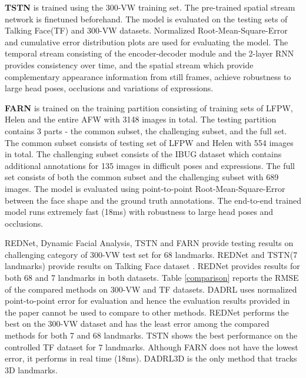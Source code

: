 \documentclass{llncs}
\begin{document}
\textbf{TSTN} \cite{tstn} is trained using the 300-VW training set. The pre-trained spatial stream network is finetuned beforehand. The model is evaluated on the testing sets of Talking Face(TF) and 300-VW datasets. Normalized Root-Mean-Square-Error and cumulative error distribution plots are used for evaluating the model. The temporal stream consisting of the encoder-decoder module and the 2-layer RNN provides consistency over time, and the spatial stream which provide complementary appearance information from still frames, achieve robustness to large head poses, occlusions and variations of expressions. 

\textbf{FARN} \cite{farn} is trained on the training partition consisting of training sets of LFPW, Helen and the entire AFW with 3148 images in total. The testing partition contains 3 parts - the common subset, the challenging subset, and the full set. The common subset consists of testing set of LFPW and Helen with 554 images in total. The challenging subset consists of the IBUG dataset which contains additional annotations for 135 images in difficult poses and expressions. The full set consists of both the common subset and the challenging subset with 689 images. The model is evaluated using point-to-point Root-Mean-Square-Error between the face shape and the ground truth annotations. The end-to-end trained model runs extremely fast (18ms) with robustness to large head poses and occlusions.

REDNet\cite{rednet}, Dynamic Facial Analysis\cite{dynamic_facial_analysis}, TSTN\cite{tstn} and FARN\cite{farn} provide testing results on challenging category of 300-VW test set for 68 landmarks. REDNet\cite{rednet} and TSTN\cite{tstn}(7 landmarks) provide results on Talking Face dataset \cite{tf}. REDNet\cite{rednet} provides results for both 68 and 7 landmarks in both datasets.
Table \ref{comparison} reports the RMSE of the compared methods on 300-VW and TF\cite{tf} datasets.
DADRL\cite{dadrl} uses normalized point-to-point error for evaluation and hence the evaluation results provided in the paper cannot be used to compare to other methods.
REDNet\cite{rednet} performs the best on the 300-VW dataset and has the least error among the compared methods for both 7 and 68 landmarks. TSTN\cite{tstn} shows the best performance on the controlled TF dataset for 7 landmarks. Although FARN\cite{farn} does not have the lowest error, it performs in real time (18ms). DADRL3D is the only method that tracks 3D landmarks.
\end{document}
